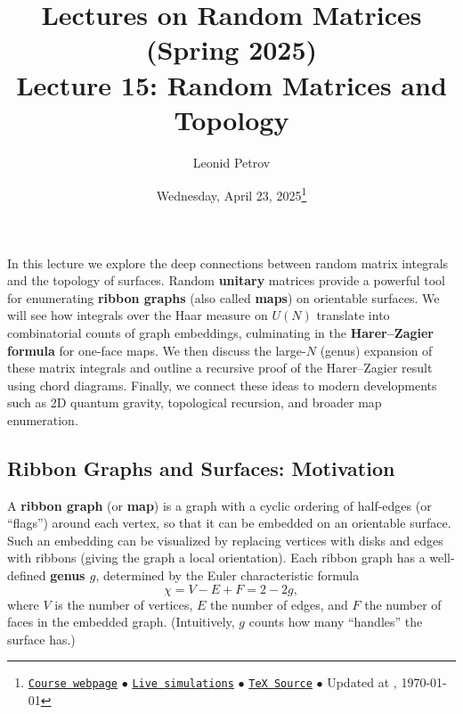 \documentclass[letterpaper,11pt,oneside,reqno]{article}
\numberwithin{equation}{section}
\theoremstyle{definition}
\begin{document}
\title{Lectures on Random Matrices
(Spring 2025)
\\Lecture 15: Random Matrices and Topology}


\date{Wednesday, April 23, 2025\footnote{\href{https://lpetrov.cc/rmt25/}{\texttt{Course webpage}}
$\bullet$ \href{https://lpetrov.cc/simulations/model/random-matrices/}{\texttt{Live simulations}}
$\bullet$ \href{https://lpetrov.cc/rmt25/rmt25-notes/rmt2025-l15.tex}{\texttt{TeX Source}}
$\bullet$
Updated at \currenttime, \today}}



\author{Leonid Petrov}


\maketitle
\tableofcontents







In this lecture we explore the deep connections between random matrix integrals and the topology of surfaces. Random \textbf{unitary} matrices provide a powerful tool for enumerating \textbf{ribbon graphs} (also called \textbf{maps}) on orientable surfaces. We will see how integrals over the Haar measure on $U(N)$ translate into combinatorial counts of graph embeddings, culminating in the \textbf{Harer–Zagier formula} for one-face maps. We then discuss the large-$N$ (genus) expansion of these matrix integrals and outline a recursive proof of the Harer–Zagier result using chord diagrams. Finally, we connect these ideas to modern developments such as 2D quantum gravity, topological recursion, and broader map enumeration.

\subsection*{Ribbon Graphs and Surfaces: Motivation}

A \textbf{ribbon graph} (or \textbf{map}) is a graph with a cyclic ordering of half-edges (or ``flags'') around each vertex, so that it can be embedded on an orientable surface. Such an embedding can be visualized by replacing vertices with disks and edges with ribbons (giving the graph a local orientation). Each ribbon graph has a well-defined \textbf{genus $g$}, determined by the Euler characteristic formula
\[ \chi = V - E + F = 2 - 2g, \]
where $V$ is the number of vertices, $E$ the number of edges, and $F$ the number of faces in the embedded graph. (Intuitively, $g$ counts how many ``handles'' the surface has.)
\end{document}
